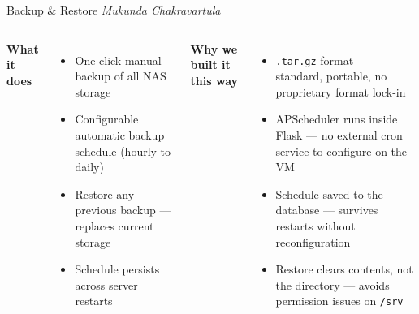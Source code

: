 \documentclass[aspectratio=169]{beamer}
\begin{document}
\begin{frame}{Backup \& Restore}
  \textit{Mukunda Chakravartula}
  \vspace{0.5em}
  \begin{columns}[T, onlytextwidth]
      \textbf{What it does}
      \begin{itemize}
        \item One-click manual backup of all NAS storage
        \item Configurable automatic backup schedule (hourly to daily)
        \item Restore any previous backup --- replaces current storage
        \item Schedule persists across server restarts
      \end{itemize}
      \textbf{Why we built it this way}
      \begin{itemize}
        \item \texttt{.tar.gz} format --- standard, portable, no proprietary format lock-in
        \item APScheduler runs inside Flask --- no external cron service to configure on the VM
        \item Schedule saved to the database --- survives restarts without reconfiguration
        \item Restore clears contents, not the directory --- avoids permission issues on \texttt{/srv}
      \end{itemize}
  \end{columns}
\end{frame}

\begin{frame}[plain]
\end{frame}
\end{document}
